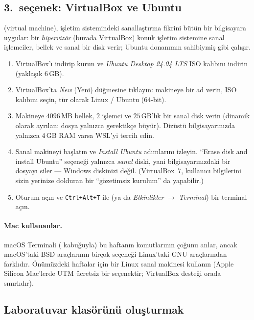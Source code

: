 \subsection{3.\ seçenek: VirtualBox ve Ubuntu}
 (virtual machine), işletim sistemindeki sanallaştırma fikrini bütün bir bilgisayara uygular: bir \emph{hipervizör} (burada VirtualBox) konuk işletim sistemine sanal işlemciler, bellek ve sanal bir disk verir; Ubuntu donanımın sahibiymiş gibi çalışır.

\begin{enumerate}[leftmargin=1.4em]
  \item VirtualBox'ı indirip kurun ve \emph{Ubuntu Desktop 24.04 LTS} ISO kalıbını indirin (yaklaşık 6\,GB).
  \item VirtualBox'ta \emph{New} (Yeni) düğmesine tıklayın: makineye bir ad verin, ISO kalıbını seçin, tür olarak Linux / Ubuntu (64-bit).
  \item Makineye $4096$\,MB bellek, $2$ işlemci ve $25$\,GB'lık bir sanal disk verin (dinamik olarak ayrılan: dosya yalnızca gerektikçe büyür). Dizüstü bilgisayarınızda yalnızca 4\,GB RAM varsa WSL'yi tercih edin.
  \item Sanal makineyi başlatın ve \emph{Install Ubuntu} adımlarını izleyin. ``Erase disk and install Ubuntu'' seçeneği yalnızca \emph{sanal} diski, yani bilgisayarınızdaki bir dosyayı siler --- Windows diskinizi değil. (VirtualBox~7, kullanıcı bilgilerini sizin yerinize dolduran bir ``gözetimsiz kurulum'' da yapabilir.)
  \item Oturum açın ve \texttt{Ctrl+Alt+T} ile (ya da \emph{Etkinlikler} $\to$ \emph{Terminal}) bir terminal açın.
\end{enumerate}

\paragraph{Mac kullananlar.} macOS Terminali ( kabuğuyla) bu haftanın komutlarının çoğunu anlar, ancak macOS'taki BSD araçlarının birçok seçeneği Linux'taki GNU araçlarından farklıdır. Önümüzdeki haftalar için bir Linux sanal makinesi kullanın (Apple Silicon Mac'lerde UTM ücretsiz bir seçenektir; VirtualBox desteği orada sınırlıdır).

\subsection{Laboratuvar klasörünü oluşturmak}
\label{sec:labsetup}

